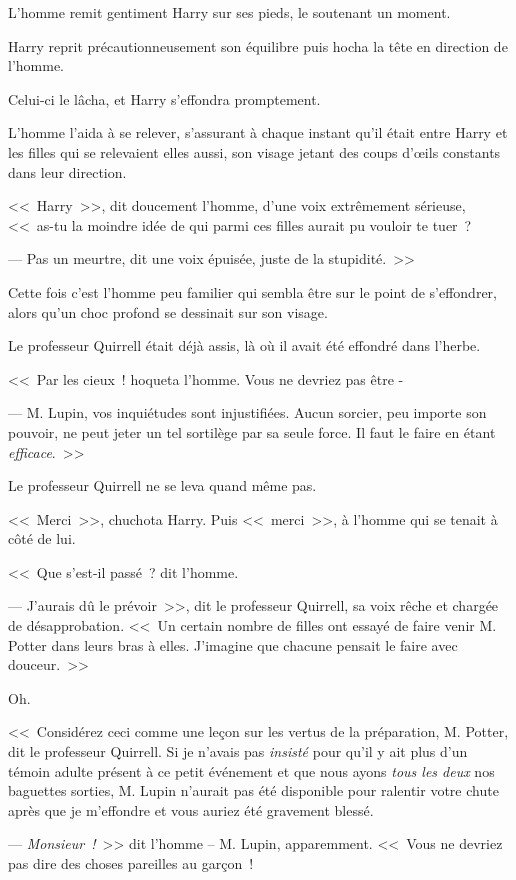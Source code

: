 L'homme remit gentiment Harry sur ses pieds, le soutenant un moment.

Harry reprit précautionneusement son équilibre puis hocha la tête en direction de l'homme.

Celui-ci le lâcha, et Harry s'effondra promptement.

L'homme l'aida à se relever, s'assurant à chaque instant qu'il était entre Harry et les filles qui se relevaient elles aussi, son visage jetant des coups d'œils constants dans leur direction.

<<~Harry~>>, dit doucement l'homme, d'une voix extrêmement sérieuse, <<~as-tu la moindre idée de qui parmi ces filles aurait pu vouloir te tuer~?

--- Pas un meurtre, dit une voix épuisée, juste de la stupidité.~>>

Cette fois c'est l'homme peu familier qui sembla être sur le point de s'effondrer, alors qu'un choc profond se dessinait sur son visage.

Le professeur Quirrell était déjà assis, là où il avait été effondré dans l'herbe.

<<~Par les cieux~! hoqueta l'homme. Vous ne devriez pas être -

--- M. Lupin, vos inquiétudes sont injustifiées. Aucun sorcier, peu importe son pouvoir, ne peut jeter un tel sortilège par sa seule force. Il faut le faire en étant \emph{efficace}.~>>

Le professeur Quirrell ne se leva quand même pas.

<<~Merci~>>, chuchota Harry. Puis <<~merci~>>, à l'homme qui se tenait à côté de lui.

<<~Que s'est-il passé~? dit l'homme.

--- J'aurais dû le prévoir~>>, dit le professeur Quirrell, sa voix rêche et chargée de désapprobation. <<~Un certain nombre de filles ont essayé de faire venir M. Potter dans leurs bras à elles. J'imagine que chacune pensait le faire avec douceur.~>>

Oh.

<<~Considérez ceci comme une leçon sur les vertus de la préparation, M. Potter, dit le professeur Quirrell. Si je n'avais pas \emph{insisté} pour qu'il y ait plus d'un témoin adulte présent à ce petit événement et que nous ayons \emph{tous les deux} nos baguettes sorties, M. Lupin n'aurait pas été disponible pour ralentir votre chute après que je m'effondre et vous auriez été gravement blessé.

--- \emph{Monsieur~!}~>> dit l'homme -- M. Lupin, apparemment. <<~Vous ne devriez pas dire des choses pareilles au garçon~!

